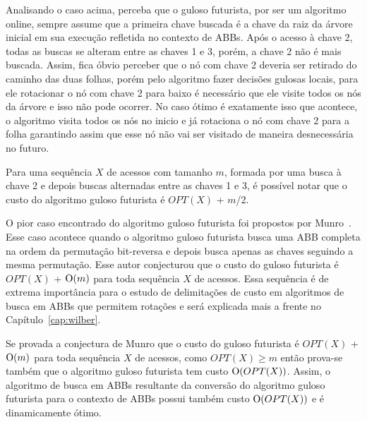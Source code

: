 Analisando o caso acima, perceba que o guloso futurista, por ser um algoritmo online, sempre assume que a primeira chave buscada é a chave da raiz da árvore inicial em sua execução refletida no contexto de ABBs. Após o acesso à chave 2, todas as buscas se alteram entre as chaves 1 e 3, porém, a chave 2 não é mais buscada. Assim, fica óbvio perceber que o nó com chave 2 deveria ser retirado do caminho das duas folhas, porém pelo algoritmo fazer decisões gulosas locais, para ele rotacionar o nó com chave 2 para baixo é necessário que ele visite todos os nós da árvore e isso não pode ocorrer. No caso ótimo é exatamente isso que acontece, o algoritmo visita todos os nós no inicio e já rotaciona o nó com chave 2 para a folha garantindo assim que esse nó não vai ser visitado de maneira desnecessária no futuro.

Para uma sequência $X$ de acessos com tamanho $m$, formada por uma busca à chave 2 e depois buscas alternadas entre as chaves 1 e 3, é possível notar que o custo do algoritmo guloso futurista é $OPT(X)$ + $m$/2.

O pior caso encontrado do algoritmo guloso futurista foi propostos por Munro~\cite{munro}. Esse caso acontece quando o algoritmo guloso futurista busca uma ABB completa na ordem da permutação bit-reversa e depois busca apenas as chaves seguindo a mesma permutação. Esse autor conjecturou que o custo do guloso futurista é $OPT(X)$ + $\mathrm{O}(m)$ para toda sequência $X$ de acessos. Essa sequência é de extrema importância para o estudo de delimitações de custo em algoritmos de busca em ABBs que permitem rotações e será explicada mais a frente no Capítulo~\ref{cap:wilber}.

Se provada a conjectura de Munro que o custo do guloso futurista é $OPT(X)$ + $\mathrm{O}(m)$ para toda sequência $X$ de acessos, como $OPT(X) \geq m$ então prova-se também que o algoritmo guloso futurista tem custo $\mathrm{O}(OPT(X))$. Assim, o algoritmo de busca em ABBs resultante da conversão do algoritmo guloso futurista para o contexto de ABBs possui também custo $\mathrm{O}(OPT(X))$ e é dinamicamente ótimo.